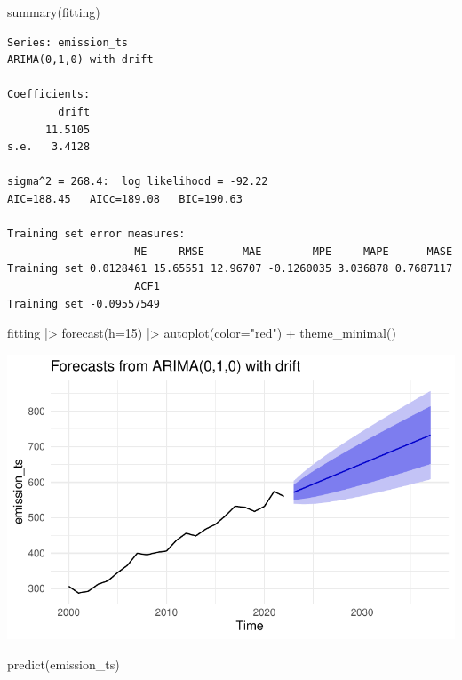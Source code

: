 \documentclass[
  letterpaper,
  DIV=11,
  numbers=noendperiod]{scrartcl}
\newenvironment{Shaded}{\begin{snugshade}}{\end{snugshade}}
\newcommand{\AttributeTok}[1]{\textcolor[rgb]{0.40,0.45,0.13}{#1}}
\newcommand{\DecValTok}[1]{\textcolor[rgb]{0.68,0.00,0.00}{#1}}
\newcommand{\FunctionTok}[1]{\textcolor[rgb]{0.28,0.35,0.67}{#1}}
\newcommand{\NormalTok}[1]{\textcolor[rgb]{0.00,0.23,0.31}{#1}}
\newcommand{\SpecialCharTok}[1]{\textcolor[rgb]{0.37,0.37,0.37}{#1}}
\newcommand{\StringTok}[1]{\textcolor[rgb]{0.13,0.47,0.30}{#1}}
\begin{document}
\begin{Shaded}
\begin{Highlighting}[]
\FunctionTok{summary}\NormalTok{(fitting)}
\end{Highlighting}
\end{Shaded}

\begin{verbatim}
Series: emission_ts 
ARIMA(0,1,0) with drift 

Coefficients:
        drift
      11.5105
s.e.   3.4128

sigma^2 = 268.4:  log likelihood = -92.22
AIC=188.45   AICc=189.08   BIC=190.63

Training set error measures:
                    ME     RMSE      MAE        MPE     MAPE      MASE
Training set 0.0128461 15.65551 12.96707 -0.1260035 3.036878 0.7687117
                    ACF1
Training set -0.09557549
\end{verbatim}

\begin{Shaded}
\begin{Highlighting}[]
\NormalTok{fitting }\SpecialCharTok{|\textgreater{}} \FunctionTok{forecast}\NormalTok{(}\AttributeTok{h=}\DecValTok{15}\NormalTok{) }\SpecialCharTok{|\textgreater{}} \FunctionTok{autoplot}\NormalTok{(}\AttributeTok{color=}\StringTok{"red"}\NormalTok{) }\SpecialCharTok{+} \FunctionTok{theme\_minimal}\NormalTok{()}
\end{Highlighting}
\end{Shaded}

\includegraphics{project_files/figure-pdf/unnamed-chunk-27-2.pdf}

\begin{Shaded}
\begin{Highlighting}[]
\FunctionTok{predict}\NormalTok{(emission\_ts)}
\end{Highlighting}
\end{Shaded}
\end{document}
